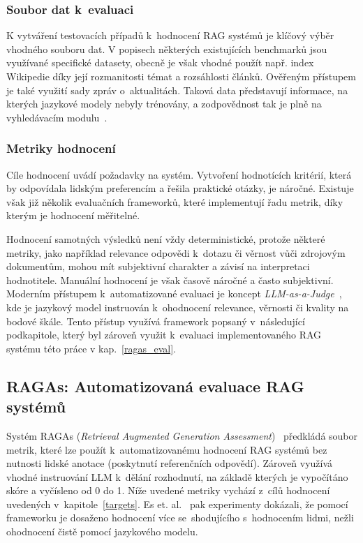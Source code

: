 \subsubsection{Soubor dat k~evaluaci}
K vytváření testovacích případů k~hodnocení RAG systémů je klíčový výběr vhodného souboru dat. V popisech některých existujících benchmarků jsou využívané specifické datasety, obecně je však vhodné použít např. index Wikipedie díky její rozmanitosti témat a rozsáhlosti článků. Ověřeným přístupem je také využití sady zpráv o~aktualitách. Taková data představují informace, na kterých jazykové modely nebyly trénovány, a zodpovědnost tak je plně na vyhledávacím modulu~\cite{yu2025evaluationrag}.

\subsubsection{Metriky hodnocení}
Cíle hodnocení uvádí požadavky na systém. Vytvoření hodnotících kritérií, která by odpovídala lidským preferencím a řešila praktické otázky, je náročné. Existuje však již několik evaluačních frameworků, které implementují řadu metrik, díky kterým je hodnocení měřitelné.

Hodnocení samotných výsledků není vždy deterministické, protože některé metriky, jako například relevance odpovědi k~dotazu či věrnost vůči zdrojovým dokumentům, mohou mít subjektivní charakter a závisí na interpretaci hodnotitele. Manuální hodnocení je však časově náročné a často subjektivní. Moderním přístupem k~automatizované evaluaci je koncept \textit{LLM-as-a-Judge}~\cite{li2024llmsasjudgescomprehensivesurveyllmbased}, kde je jazykový model instruován k~ohodnocení relevance, věrnosti či kvality na bodové škále. Tento přístup využívá framework popsaný v~následující podkapitole, který byl zároveň využit k~evaluaci implementovaného RAG systému této práce v kap.~\ref{ragas_eval}. 

\subsection{RAGAs: Automatizovaná evaluace RAG systémů}
\label{ragastheory}
Systém RAGAs (\textit{Retrieval Augmented Generation Assessment})~\cite{es2023ragasautomatedevaluationretrieval} předkládá soubor metrik, které lze použít k~automatizovanému hodnocení RAG systémů bez nutnosti lidské anotace (poskytnutí referenčních odpovědí). Zároveň využívá vhodné instruování LLM k~dělání rozhodnutí, na základě kterých je vypočítáno skóre a vyčísleno od 0 do 1. Níže uvedené metriky vychází z~cílů hodnocení uvedených v~kapitole~\ref{targets}. Es et. al.~\cite{es2023ragasautomatedevaluationretrieval} pak experimenty dokázali, že pomocí frameworku je dosaženo hodnocení více se~shodujícího s~hodnocením lidmi, nežli ohodnocení čistě pomocí jazykového modelu.

